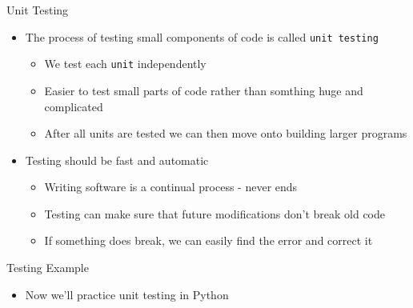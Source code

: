\documentclass[11pt,professionalfonts]{beamer}
\begin{document}
\begin{frame}{Unit Testing}
    \begin{itemize}
        \item The process of testing small components of code is called \texttt{unit testing}
            \begin{itemize}
                \item We test each \texttt{unit} independently
                \item Easier to test small parts of code rather than somthing huge and complicated
                \item After all units are tested we can then move onto building larger programs
            \end{itemize}
        \item Testing should be fast and automatic
            \begin{itemize}
                \item Writing software is a continual process - never ends
                \item Testing can make sure that future modifications don't break old code 
                \item If something does break, we can easily find the error and correct it
            \end{itemize} 
    \end{itemize}
\end{frame}

\begin{frame}{Testing Example}
    \begin{itemize}
        \item Now we'll practice unit testing in Python
    \end{itemize}
\end{frame}
\end{document}

